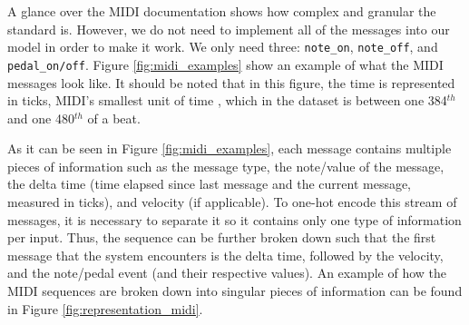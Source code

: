 \documentclass[a4paper]{book}
\begin{document}
A glance over the MIDI documentation \parencite{midi_association_official_2019} shows how complex and granular the standard is. However, we do not need to implement all of the messages into our model in order to make it work. We only need three: \texttt{note\_on}, \texttt{note\_off}, and \texttt{pedal\_on/off}. Figure \ref{fig:midi_examples} show an example of what the MIDI messages look like. It should be noted that in this figure, the time is represented in ticks, MIDI's smallest unit of time \parencite{midi_association_official_2019}, which in the dataset is between one 384$^{th}$ and one 480$^{th}$ of a beat.

As it can be seen in Figure \ref{fig:midi_examples}, each message contains multiple pieces of information such as the message type, the note/value of the message, the delta time (time elapsed since last message and the current message, measured in ticks), and velocity (if applicable). To one-hot encode this stream of messages, it is necessary to separate it so it contains only one type of information per input. Thus, the sequence can be further broken down such that the first message that the system encounters is the delta time, followed by the velocity, and the note/pedal event (and their respective values). An example of how the MIDI sequences are broken down into singular pieces of information can be found in Figure \ref{fig:representation_midi}.
\end{document}
